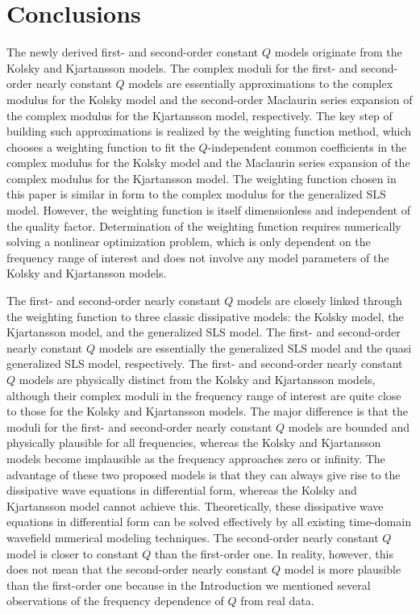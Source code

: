 \documentclass[article]{./macros/elsarticle_qh}
\begin{document}
\section{Conclusions}
The newly derived first- and second-order constant $Q$ models originate from the Kolsky and Kjartansson models. The complex moduli for the first- and second-order nearly constant $Q$ models are essentially approximations to the complex modulus for the Kolsky model and the second-order Maclaurin series expansion of the complex modulus for the Kjartansson model, respectively. The key step of building such approximations is realized by the weighting function method, which chooses a weighting function to fit the $Q$-independent common coefficients in the complex modulus for the Kolsky model and the Maclaurin series expansion of the complex modulus for the Kjartansson model. The weighting function chosen in this paper is similar in form to the complex modulus for the generalized SLS model. However, the weighting function is itself dimensionless and independent of the quality factor. Determination of the weighting function requires numerically solving a nonlinear optimization problem, which is only dependent on the frequency range of interest and does not involve any model parameters of the Kolsky and Kjartansson models. 

The first- and second-order nearly constant $Q$ models are closely linked through the weighting function to three classic dissipative models: the Kolsky model, the Kjartansson model, and the generalized SLS model. The first- and second-order nearly constant $Q$ models are essentially the generalized SLS model and the quasi generalized SLS model, respectively. The first- and second-order nearly constant $Q$ models are physically distinct from the Kolsky and Kjartansson models, although their complex moduli in the frequency range of interest are quite close to those for the Kolsky and Kjartansson models. The major difference is that the moduli for the first- and second-order nearly constant $Q$ models are bounded and physically plausible for all frequencies, whereas the Kolsky and Kjartansson models become implausible as the frequency approaches zero or infinity. The advantage of these two proposed models is that they can always give rise to the dissipative wave equations in differential form, whereas the Kolsky and Kjartansson model cannot achieve this. Theoretically, these dissipative wave equations in differential form can be solved effectively by all existing time-domain wavefield numerical modeling techniques. The second-order nearly constant $Q$ model is closer to constant $Q$ than the first-order one. In reality, however, this does not mean that the second-order nearly constant $Q$ model is more plausible than the first-order one because in the Introduction we mentioned several observations of the frequency dependence of $Q$ from real data.  
\end{document}

